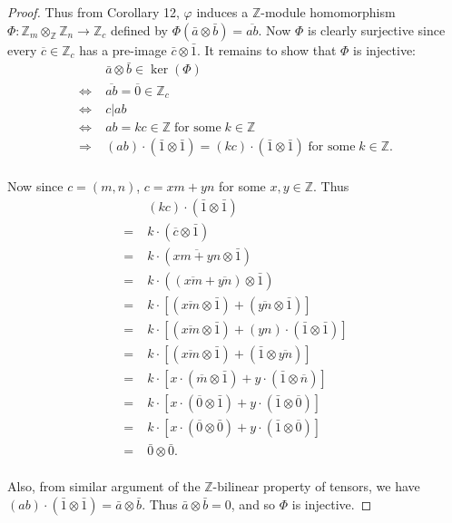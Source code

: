 \documentclass{article}
\begin{document}
\begin{enumerate}[label={(\alph*)}]
\begin{proof}
        Thus from Corollary 12, $\varphi$ induces a $\mathbb{Z}$-module
        homomorphism $\Phi:\mathbb{Z}_m\otimes_\mathbb{Z}\mathbb{Z}_n
        \rightarrow\mathbb{Z}_c$ defined by
        $\Phi(\bar{a}\otimes\bar{b})=\overline{ab}$. Now $\Phi$ is clearly
        surjective since every $\overline{c}\in\mathbb{Z}_c$ has a
        pre-image $\bar{c}\otimes\bar{1}$. It remains to show that $\Phi$
        is injective:
        \begin{align*}
          \;&\bar{a}\otimes\bar{b}\in\ker(\Phi)\\
          \Leftrightarrow\;&\overline{ab}=\overline{0}\in\mathbb{Z}_c\\
          \Leftrightarrow\;&c|ab\\
          \Leftrightarrow\;&ab=kc\in\mathbb{Z}\; \text{for some}\;
            k\in\mathbb{Z}\\
          \Rightarrow\;&(ab)\cdot(\bar{1}\otimes\bar{1})
            =(kc)\cdot(\bar{1}\otimes\bar{1})\; \text{for some}\;
            k\in\mathbb{Z}.\\
        \end{align*}

        Now since $c=(m,n)$, $c=xm+yn$ for some $x,y\in\mathbb{Z}$. Thus
        \begin{align*}
          \;&(kc)\cdot(\bar{1}\otimes\bar{1})\\
          =\;&k\cdot(\overline{c}\otimes\bar{1})\\
          =\;&k\cdot(\overline{xm+yn}\otimes\bar{1})\\
          =\;&k\cdot((\overline{xm}+\overline{yn})\otimes\bar{1})\\
          =\;&k\cdot[(\overline{xm}\otimes\bar{1})
            +(\overline{yn}\otimes\bar{1})]\\
          =\;&k\cdot[(\overline{xm}\otimes\bar{1})
            +(yn)\cdot(\bar{1}\otimes\bar{1})]\\
          =\;&k\cdot[(\overline{xm}\otimes\bar{1})
            +(\bar{1}\otimes\overline{yn})]\\
          =\;&k\cdot[x\cdot(\overline{m}\otimes\bar{1})
            +y\cdot(\bar{1}\otimes\overline{n})]\\
          =\;&k\cdot[x\cdot(\overline{0}\otimes\bar{1})
            +y\cdot(\bar{1}\otimes\overline{0})]\\
          =\;&k\cdot[x\cdot(\overline{0}\otimes\bar{0})
            +y\cdot(\bar{1}\otimes\overline{0})]\\
          =\;&\bar{0}\otimes\bar{0}.\\
        \end{align*}

        Also, from similar argument of the $\mathbb{Z}$-bilinear property
        of tensors, we have $(ab)\cdot(\bar{1}\otimes\bar{1})
        =\bar{a}\otimes\bar{b}$. Thus $\bar{a}\otimes\bar{b}=0$, and so
        $\Phi$ is injective.
      \end{proof}
  \end{enumerate}
\end{document}
